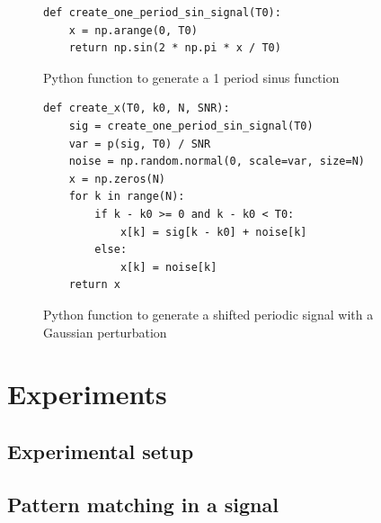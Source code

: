 \documentclass[a4paper]{article}
\begin{document}
\begin{figure}[ht!]
\begin{lstlisting}
def create_one_period_sin_signal(T0):
    x = np.arange(0, T0)
    return np.sin(2 * np.pi * x / T0)
\end{lstlisting}
\caption{Python function to generate a 1 period sinus function}
\label{one_period_sin_signal.py}
\end{figure}




\begin{figure}[ht!]
\begin{lstlisting}
def create_x(T0, k0, N, SNR):
    sig = create_one_period_sin_signal(T0)
    var = p(sig, T0) / SNR
    noise = np.random.normal(0, scale=var, size=N)
    x = np.zeros(N)
    for k in range(N):
        if k - k0 >= 0 and k - k0 < T0:
            x[k] = sig[k - k0] + noise[k]
        else:
            x[k] = noise[k]
    return x
\end{lstlisting}
\caption{Python function to generate a shifted periodic signal with a Gaussian perturbation}
\label{create_x.py}
\end{figure}















\section{Experiments}
    \subsection{Experimental setup}
    \subsection{Pattern matching in a signal}
\end{document}
